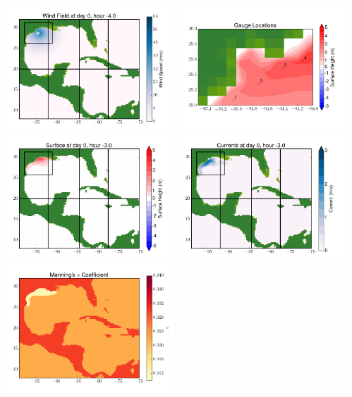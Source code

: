\documentclass[11pt]{article}
\begin{document}
\vskip 10pt 
\includegraphics[width=0.475\textwidth]{frame0068fig9.png}
\includegraphics[width=0.475\textwidth]{frame0068fig10.png}
\vskip 10pt 
\includegraphics[width=0.475\textwidth]{frame0069fig1.png}
\includegraphics[width=0.475\textwidth]{frame0069fig2.png}
\vskip 10pt 
\includegraphics[width=0.475\textwidth]{frame0069fig3.png}
\end{document}
